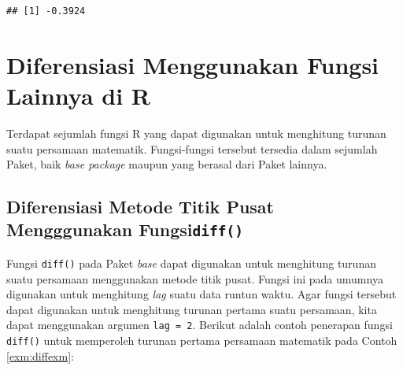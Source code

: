 \documentclass[
]{book}
\newenvironment{Shaded}{\begin{snugshade}}{\end{snugshade}}
\newcommand{\AttributeTok}[1]{\textcolor[rgb]{0.13,0.29,0.53}{#1}}
\newcommand{\CommentTok}[1]{\textcolor[rgb]{0.56,0.35,0.01}{\textit{#1}}}
\newcommand{\ControlFlowTok}[1]{\textcolor[rgb]{0.13,0.29,0.53}{\textbf{#1}}}
\newcommand{\DecValTok}[1]{\textcolor[rgb]{0.00,0.00,0.81}{#1}}
\newcommand{\FunctionTok}[1]{\textcolor[rgb]{0.13,0.29,0.53}{\textbf{#1}}}
\newcommand{\NormalTok}[1]{#1}
\newcommand{\OtherTok}[1]{\textcolor[rgb]{0.56,0.35,0.01}{#1}}
\newcommand{\SpecialCharTok}[1]{\textcolor[rgb]{0.81,0.36,0.00}{\textbf{#1}}}
\theoremstyle{definition}
\theoremstyle{definition}
\theoremstyle{definition}
\theoremstyle{definition}
\theoremstyle{remark}
\begin{document}
\begin{verbatim}
## [1] -0.3924
\end{verbatim}

\hypertarget{diffother}{%
\section{Diferensiasi Menggunakan Fungsi Lainnya di R}\label{diffother}}

Terdapat sejumlah fungsi R yang dapat digunakan untuk menghitung turunan suatu persamaan matematik. Fungsi-fungsi tersebut tersedia dalam sejumlah Paket, baik \emph{base package} maupun yang berasal dari Paket lainnya.

\hypertarget{diferensiasi-metode-titik-pusat-mengggunakan-fungsidiff}{%
\subsection{\texorpdfstring{Diferensiasi Metode Titik Pusat Mengggunakan Fungsi\texttt{diff()}}{Diferensiasi Metode Titik Pusat Mengggunakan Fungsidiff()}}\label{diferensiasi-metode-titik-pusat-mengggunakan-fungsidiff}}

Fungsi \texttt{diff()} pada Paket \emph{base} dapat digunakan untuk menghitung turunan suatu persamaan menggunakan metode titik pusat. Fungsi ini pada umumnya digunakan untuk menghitung \emph{lag} suatu data runtun waktu. Agar fungsi tersebut dapat digunakan untuk menghitung turunan pertama suatu persamaan, kita dapat menggunakan argumen \texttt{lag\ =\ 2}. Berikut adalah contoh penerapan fungsi \texttt{diff()} untuk memperoleh turunan pertama persamaan matematik pada Contoh \ref{exm:diffexm}:

\begin{Shaded}
\end{Shaded}
\end{document}
